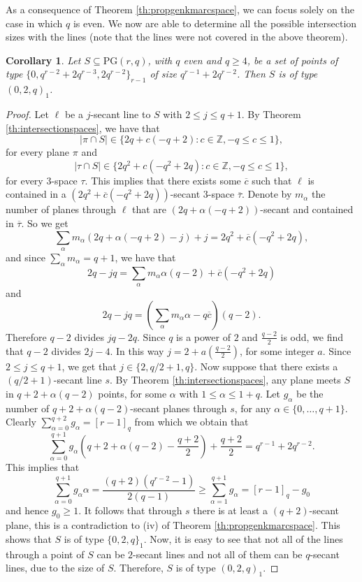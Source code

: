 \documentclass[11pt]{amsart}
\newtheorem{corollary}[theorem]{Corollary}
\newcommand{\PG}{\mathrm{PG}}
\begin{document}
As a consequence of Theorem \ref{th:propgenkmarcspace}, we can focus solely on the case in which $q$ is even. We now are able to determine all the possible intersection sizes with the lines (note that the lines were not covered in the above theorem).

\begin{corollary} \label{cor:sisevenset}
Let $S \subseteq \PG(r,q)$, with $q$ even and $q\geq 4$, be a set of points of type $\{0,q^{r-2}+2q^{r-3},2q^{r-2}\}_{r-1}$ of size $q^{r-1}+2q^{r-2}$. Then $S$ is of type $(0,2,q)_1$. 
\end{corollary}

\begin{proof}
Let $\ell$ be a $j$-secant line to $S$ with $2\leq j \leq q+1$. By Theorem  \ref{th:intersectionspaces}, we have that 
\[ |\pi \cap S| \in \{2q+c(-q+2) \colon c \in \mathbb{Z},-q \leq c \leq 1\}, \]
for every plane $\pi$ and 
\[
 |\tau \cap S| \in \{2q^{2}+c(-q^{2}+2q) \colon c \in \mathbb{Z},-q \leq c \leq 1\},
\]
for every $3$-space $\tau$. This implies that there exists some $\overline{c}$ such that $\ell$ is contained in a $(2q^{2}+\overline{c}(-q^{2}+2q))$-secant $3$-space $\overline{\tau}$.
Denote by $m_{\alpha}$ the number of planes through $\ell$ that are $(2q+{\alpha}(-q+2))$-secant and contained in $\overline{\tau}$. So we get
\[
 \sum_{\alpha} m_{\alpha} (2q+{\alpha}(-q+2)-j)+j=2q^{2}+\overline{c}(-q^{2}+2q),
\]
and since $\sum_{\alpha} m_{\alpha}=q+1$, we have that
\[
2q-jq=\sum_{\alpha} m_{\alpha} {\alpha}(q-2)+\overline{c}(-q^{2}+2q)
\]
and 
\[
2q-jq=\left(\sum_{\alpha} m_{\alpha} {\alpha}-q\overline{c}\right)(q-2).
\]
Therefore $q-2$ divides $jq-2q$. Since $q$ is a power of $2$ and $\frac{q-2}2$ is odd, we find that $q-2$ divides $2j-4$. In this way $j=2+a(\frac{q-2}{2})$, for some integer $a$. Since $2 \leq j \leq q+1$, we get that $j \in \{2,q/2+1,q\}$. Now suppose that there exists a $(q/2+1)$-secant line $s$. By Theorem \ref{th:intersectionspaces}, any plane meets $S$ in $q+2+\alpha(q-2)$ points, for some $\alpha$ with $1 \leq \alpha \leq 1+q$.
Let $g_\alpha$ be the number of $q+2+\alpha(q-2)$-secant planes through $s$, for any $\alpha \in \{0,\ldots,q+1\}$. Clearly $\sum_{\alpha=0}^{q+2} g_{\alpha}=[r-1]_q$ from which we obtain that
\[
\sum_{\alpha=0}^{q+1}g_{\alpha}(q+2+\alpha(q-2)-\frac{q+2}{2} )+\frac{q+2}{2}=q^{r-1}+2q^{r-2}.
\]
This implies that 
\[
\sum_{\alpha=0}^{q+1}g_\alpha \alpha=\frac{(q+2)(q^{r-2}-1)}{2(q-1)} \geq \sum_{\alpha=1}^{q+1}g_\alpha =[r-1]_q-g_0
\]
and hence $g_0 \geq 1$. It follows that through $s$ there is at least a $(q+2)$-secant plane, this is a contradiction to (iv) of Theorem \ref{th:propgenkmarcspace}. This shows that $S$ is of type $\{0,2,q\}_1$. Now, it is easy to see that not all of the lines through a point of $S$ can be $2$-secant lines and not all of them can be $q$-secant lines, due to the size of $S$. Therefore, $S$ is of type $(0,2,q)_1$.
\end{proof}
\end{document}
